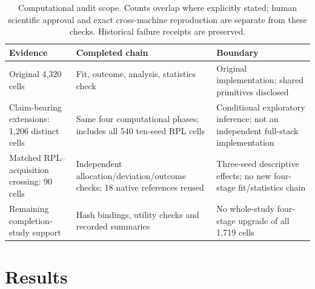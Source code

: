 \documentclass[11pt]{article}
\begin{document}
\begin{table}[tbp]\centering\small
\caption{Computational audit scope. Counts overlap where explicitly stated;
human scientific approval and exact cross-machine reproduction are separate
from these checks. Historical failure receipts are preserved.}
\label{tab:audit_levels}
\begin{tabular}{>{\raggedright\arraybackslash}p{}>{\raggedright\arraybackslash}p{}>{\raggedright\arraybackslash}p{}}\toprule
Evidence & Completed chain & Boundary\\\midrule
Original 4,320 cells & Fit, outcome, analysis, statistics check & Original implementation; shared primitives disclosed\\
Claim-bearing extensions: 1,206 distinct cells & Same four computational phases; includes all 540 ten-seed RPL cells & Conditional exploratory inference; not an independent full-stack implementation\\
Matched RPL--acquisition crossing: 90 cells & Independent allocation/deviation/outcome checks; 18 native references reused & Three-seed descriptive effects; no new four-stage fit/statistics chain\\
Remaining completion-study support & Hash bindings, utility checks and recorded summaries & No whole-study four-stage upgrade of all 1,719 cells\\\bottomrule
\end{tabular}\end{table}
\section{Results}\label{sec:results}
\end{document}
